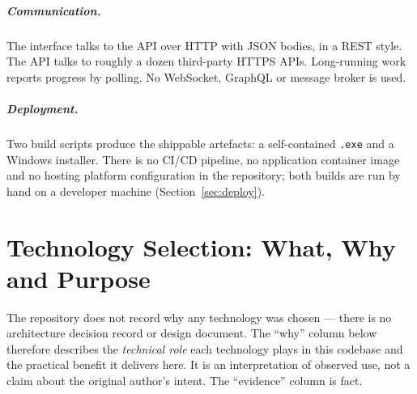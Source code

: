 \documentclass[11pt,a4paper]{report}
\newcommand{\code}[1]{\texttt{\small #1}}
\begin{document}
\paragraph{Communication.} The interface talks to the API over HTTP with JSON
bodies, in a REST style. The API talks to roughly a dozen third-party HTTPS APIs.
Long-running work reports progress by polling. No WebSocket, GraphQL or message
broker is used.

\paragraph{Deployment.} Two build scripts produce the shippable artefacts: a
self-contained \code{.exe} and a Windows installer. There is no CI/CD pipeline,
no application container image and no hosting platform configuration in the
repository; both builds are run by hand on a developer machine
(Section~\ref{sec:deploy}).

\chapter{Technology Selection: What, Why and Purpose}
\label{sec:why}

The repository does not record why any technology was chosen --- there is no
architecture decision record or design document. The ``why'' column below
therefore describes the \emph{technical role} each technology plays in this
codebase and the practical benefit it delivers here. It is an interpretation of
observed use, not a claim about the original author's intent. The ``evidence''
column is fact.
\end{document}
